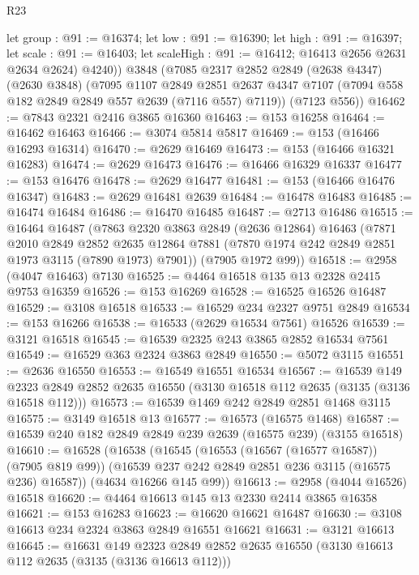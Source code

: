 \begin{lexlean}{R23}
\begin{coremodule}
        let group : @91 := @16374;
        let low : @91 := @16390;
        let high : @91 := @16397;
        let scale : @91 := @16403; let scaleHigh : @91 := @16412; @16413 @2656 @2631 @2634 @2624)
        @4240))
    @3848
    (@7085
      @2317
      @2852
      @2849
      (@2638 @4347)
      (@2630 @3848)
      (@7095
        @1107
        @2849
        @2851
        @2637
        @4347
        @7107
        (@7094 @558 @182 @2849 @2849 @557 @2639 (@7116 @557) @7119))
      (@7123 @556))
@16462 := @7843 @2321 @2416 @3865 @16360
@16463 := @153 @16258
@16464 := @16462 @16463
@16466 := @3074 @5814 @5817
@16469 := @153 (@16466 @16293 @16314)
@16470 := @2629 @16469
@16473 := @153 (@16466 @16321 @16283)
@16474 := @2629 @16473
@16476 := @16466 @16329 @16337
@16477 := @153 @16476
@16478 := @2629 @16477
@16481 := @153 (@16466 @16476 @16347)
@16483 := @2629 @16481 @2639
@16484 := @16478 @16483
@16485 := @16474 @16484
@16486 := @16470 @16485
@16487 := @2713 @16486
@16515 := @16464
    @16487
    (@7863
      @2320
      @3863
      @2849
      (@2636 @12864)
      @16463
      (@7871
        @2010
        @2849
        @2852
        @2635
        @12864
        @7881
        (@7870 @1974 @242 @2849 @2851 @1973 @3115 (@7890 @1973) @7901))
      (@7905 @1972 @99))
@16518 := @2958 (@4047 @16463) @7130
@16525 := @4464 @16518 @135 @13 @2328 @2415 @9753 @16359
@16526 := @153 @16269
@16528 := @16525 @16526 @16487
@16529 := @3108 @16518
@16533 := @16529 @234 @2327 @9751 @2849
@16534 := @153 @16266
@16538 := @16533 (@2629 @16534 @7561) @16526
@16539 := @3121 @16518
@16545 := @16539 @2325 @243 @3865 @2852 @16534 @7561
@16549 := @16529 @363 @2324 @3863 @2849
@16550 := @5072 @3115
@16551 := @2636 @16550
@16553 := @16549 @16551 @16534
@16567 := @16539
    @149
    @2323
    @2849
    @2852
    @2635
    @16550
    (@3130 @16518 @112 @2635 (@3135 (@3136 @16518 @112)))
@16573 := @16539 @1469 @242 @2849 @2851 @1468 @3115
@16575 := @3149 @16518 @13
@16577 := @16573 (@16575 @1468)
@16587 := @16539 @240 @182 @2849 @2849 @239 @2639 (@16575 @239) (@3155 @16518)
@16610 := @16528
    (@16538
      (@16545
        (@16553 (@16567 (@16577 @16587)) (@7905 @819 @99))
        (@16539 @237 @242 @2849 @2851 @236 @3115 (@16575 @236) @16587))
      (@4634 @16266 @145 @99))
@16613 := @2958 (@4044 @16526) @16518
@16620 := @4464 @16613 @145 @13 @2330 @2414 @3865 @16358
@16621 := @153 @16283
@16623 := @16620 @16621 @16487
@16630 := @3108 @16613 @234 @2324 @3863 @2849 @16551 @16621
@16631 := @3121 @16613
@16645 := @16631
    @149
    @2323
    @2849
    @2852
    @2635
    @16550
    (@3130 @16613 @112 @2635 (@3135 (@3136 @16613 @112)))

\end{coremodule}
\end{lexlean}
